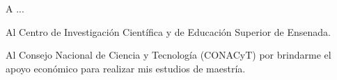 
\hspace{12pt}
A ...
\bigskip

Al Centro de Investigación Científica y de Educación Superior de Ensenada.
\bigskip

Al Consejo Nacional de Ciencia y Tecnología (CONACyT) por brindarme el apoyo econ\'omico para realizar mis estudios de \newline maestría.
